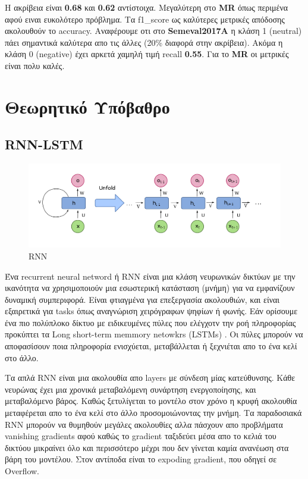 \documentclass[12pt]{article}
\begin{document}
Η ακρίβεια είναι \textbf{0.68} και \textbf{0.62} αντίστοιχα. Μεγαλύτερη στο \textbf{MR} όπως περιμένα αφού ειναι ευκολότερο πρόβλημα. Τα f1\_score ως καλύτερες μετρικές απόδοσης ακολουθούν το accuracy. Αναφέρουμε οτι στο \textbf{Semeval2017A} η κλάση 1 (neutral) πάει σημαντικά καλύτερα απο τις άλλες (20\% διαφορά στην ακρίβεια). Ακόμα η κλάση 0 (negative) έχει αρκετά χαμηλή τιμή recall \textbf{0.55}. Για το \textbf{MR} οι μετρικές είναι πολυ καλές.


\section{Θεωρητικό Υπόβαθρο}


\subsection*{RNN-LSTM}
\begin{figure}[h!]
	\centering
	\includegraphics[width=0.6\linewidth]{./img/rnn.svg.png}
	\caption{RNN}
	\label{fig:sin}
\end{figure}


Ένα recurrent neural netword ή RNN είναι μια κλάση νευρωνικών δικτύων με την ικανότητα να χρησιμοποιούν μια εσωστερική κατάσταση (μνήμη) για να εμφανίζουν δυναμική συμπεριφορά.  Είναι φτιαγμένα για επεξεργασία ακολουθιών, και είναι εξαιρετικά για tasks όπως αναγνώριση χειρόγραφων ψηφίων ή φωνής. Εάν ορίσουμε ένα πιο πολύπλοκο δίκτυο με ειδικευμένες πύλες που ελέγχοτν την ροή πληροφορίας προκύπτει τα  Long short-term memmory netowkrs (LSTMs) . Οι πύλες μπορούν να αποφασίσουν ποια πληροφορία ενισχύεται, μεταβάλλεται ή ξεχνιέται απο το ένα κελί στο άλλο.

Τα απλά RNN είναι μια ακολουθία απο layers με σύνδεση μίας κατεύθυνσης. Κάθε νευρώνας έχει μια χρονικά μεταβαλόμενη συνάρτηση ενεργοποίησης, και μεταβαλόμενο βάρος.  Καθώς ξετυλίγεται το μοντέλο στον χρόνο η κρυφή ακολουθία μεταφέρεται απο το ένα κελί στο άλλο προσομοιώνοντας την μνήμη. Τα παραδοσιακά RNN μπορούν να θυμηθούν μεγάλες ακολουθίες αλλα πάσχουν απο προβλήματα vanishing gradients αφού καθώς το gradient ταξιδεύει μέσα απο το κελιά του δικτύου μικραίνει όλο και περισσότερο μέχρι που δεν γίνεται καμία ανανέωση στα βάρη του μοντέλου. Στον αντίποδα είναι το expoding gradient, που οδηγεί σε Overflow. 
\end{document}
